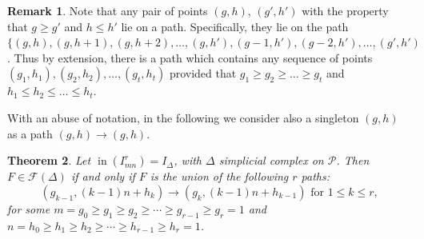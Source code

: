 \documentclass[12pt]{amsart}
\numberwithin{equation}{section}
\newtheorem{theorem}{Theorem}[section]
\theoremstyle{definition}
\newtheorem{remark}[theorem]{Remark}
\DeclareMathOperator{\ini}{in}
\begin{document}
\begin{remark}\label{completingPaths}
Note that any pair of points $(g, h)$, $(g', h')$ with the property that $g \geq g'$ and $h \leq h'$ lie on a path.  Specifically, they lie on the path $\{(g, h), (g, h+1), (g, h+2), \dots, (g, h'), (g -1, h'), (g-2, h'), \dots, (g', h')$. Thus by extension, there is a path which contains any sequence of points $(g_1, h_1), (g_2, h_2), \dots, (g_t, h_t)$ provided that $g_1 \geq g_2 \geq \dots \geq g_t$ and $h_1 \leq h_2 \leq \dots \leq h_t$.
\end{remark}
With an abuse of notation, in the following we consider also a singleton $(g,h)$ as a path $(g,h)\longrightarrow (g,h)$. 
  \begin{theorem}\label{facets}
      Let $\ini(I_{mn}^r)=I_\Delta$, with $\Delta$ simplicial complex on $\mathcal{P}$. Then $F\in \mathcal{F}(\Delta)$ if and only if $F$ is the union of the following $r$ paths:      
 \[
  	(g_{k-1}, (k-1)n+h_{k}) \longrightarrow (g_{k},(k-1)n+h_{k-1}) \mbox{ for $1\leq k\leq r$,}
\]  
    for some $m=g_0\geq g_1\geq g_2\geq \cdots \geq g_{r-1}\geq g_r= 1$ and $n=h_0\geq h_1\geq h_2\geq\cdots \geq h_{r-1}\geq h_r= 1$.
  \end{theorem}
 
\end{document}
